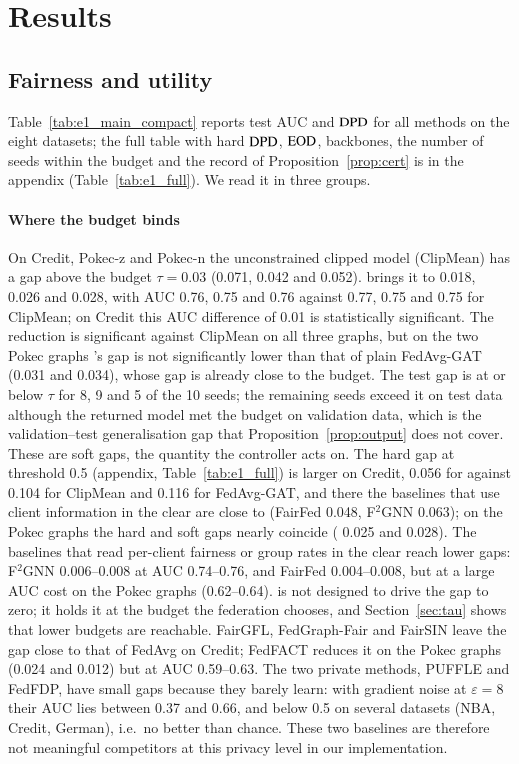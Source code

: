 \section{Results}\label{sec:results}



\subsection{Fairness and utility}\label{sec:main}

Table~\ref{tab:e1_main_compact} reports test AUC and $\mathrm{DPD}$ for all methods on the eight datasets; the full table with hard $\mathrm{DPD}$, $\mathrm{EOD}$, backbones, the number of seeds within the budget and the record of Proposition~\ref{prop:cert} is in the appendix (Table~\ref{tab:e1_full}). We read it in three groups.

\paragraph{Where the budget binds}
On Credit, Pokec-z and Pokec-n the unconstrained clipped model (ClipMean) has a gap above the budget $\tau=0.03$ (0.071, 0.042 and 0.052). \clamp{} brings it to 0.018, 0.026 and 0.028, with AUC 0.76, 0.75 and 0.76 against 0.77, 0.75 and 0.75 for ClipMean; on Credit this AUC difference of 0.01 is statistically significant. The reduction is significant against ClipMean on all three graphs, but on the two Pokec graphs \clamp{}'s gap is not significantly lower than that of plain FedAvg-GAT (0.031 and 0.034), whose gap is already close to the budget. The test gap is at or below $\tau$ for 8, 9 and 5 of the 10 seeds; the remaining seeds exceed it on test data although the returned model met the budget on validation data, which is the validation--test generalisation gap that Proposition~\ref{prop:output} does not cover. These are soft gaps, the quantity the controller acts on. The hard gap at threshold 0.5 (appendix, Table~\ref{tab:e1_full}) is larger on Credit, 0.056 for \clamp{} against 0.104 for ClipMean and 0.116 for FedAvg-GAT, and there the baselines that use client information in the clear are close to \clamp{} (FairFed 0.048, F$^2$GNN 0.063); on the Pokec graphs the hard and soft gaps nearly coincide (\clamp{} 0.025 and 0.028). The baselines that read per-client fairness or group rates in the clear reach lower gaps: F$^2$GNN 0.006--0.008 at AUC 0.74--0.76, and FairFed 0.004--0.008, but at a large AUC cost on the Pokec graphs (0.62--0.64). \clamp{} is not designed to drive the gap to zero; it holds it at the budget the federation chooses, and Section~\ref{sec:tau} shows that lower budgets are reachable. FairGFL, FedGraph-Fair and FairSIN leave the gap close to that of FedAvg on Credit; FedFACT reduces it on the Pokec graphs (0.024 and 0.012) but at AUC 0.59--0.63. The two private methods, PUFFLE and FedFDP, have small gaps because they barely learn: with gradient noise at $\varepsilon=8$ their AUC lies between 0.37 and 0.66, and below 0.5 on several datasets (NBA, Credit, German), i.e.\ no better than chance. These two baselines are therefore not meaningful competitors at this privacy level in our implementation.

